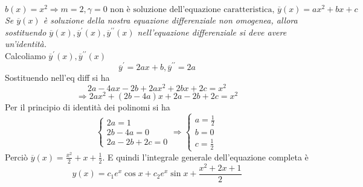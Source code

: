 \begin{equation*}
	b(x)=x^2\Rightarrow m=2,\gamma=0\text{ non è soluzione dell'equazione caratteristica, } \overline{y}(x)=ax^2+bx+c
\end{equation*}
\textit{Se $\overline{y}(x)$ è soluzione della nostra equazione differenziale non omogenea, allora sostituendo $\overline{y}(x),\overline{y}^\prime(x),\overline{y}^{\prime\prime}(x)$ nell'equazione differenziale si deve avere un'identità.}\\
Calcoliamo  $\overline{y}^\prime(x),\overline{y}^{\prime\prime}(x)$
\begin{equation*}
	\overline{y}^\prime=2ax+b,\overline{y}^{\prime\prime}=2a
\end{equation*}
Sostituendo nell’eq diff si ha
\begin{equation}
	2a-4ax-2b+2ax^2+2bx+2c=x^2
\end{equation}
\begin{equation*}
	\Rightarrow 2ax^2+(2b-4a)x+2a-2b+2c=x^2
\end{equation*}
Per il principio di identità dei polinomi si ha
\begin{equation}
	\begin{cases}
		2a=1\\
		2b-4a=0\\
		2a-2b+2c=0
	\end{cases}\Rightarrow
	\begin{cases}
		a=\frac{1}{2}\\
		b=0\\
		c=\frac{1}{2}
	\end{cases}
\end{equation}
Perciò $\overline{y}(x)=\frac{x^2}{2}+x+\frac{1}{2}$. E quindi l'integrale generale dell'equazione completa è
\begin{equation*}
	y(x)=c_1e^x\cos x+c_2e^x\sin x+\frac{x^2+2x+1}{2}
\end{equation*}
